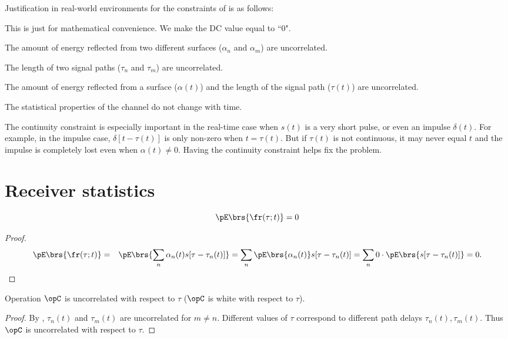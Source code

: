 Justification in real-world environments 
for the constraints of  is as follows:
\begin{enume}
  \item This is just for mathematical convenience.
        We make the DC value equal to ``0".
  \item The amount of energy reflected from two different surfaces
        ($\alpha_n$ and $\alpha_m$) are uncorrelated.
  \item The length of two signal paths ($\tau_n$ and $\tau_m$) 
        are uncorrelated.
  \item The amount of energy reflected from a surface ($\alpha(t)$)
        and the length of the signal path ($\tau(t)$) are 
        uncorrelated.
  \item The statistical properties of the channel do not change with time.
  \item The continuity constraint is especially important in the real-time
case when $s(t)$ is a very short pulse, or even an impulse $\delta(t)$.
For example, in the impulse case, $\delta[t-\tau(t)]$ is only non-zero
when $t=\tau(t)$. But if $\tau(t)$ is not continuous, it may never equal $t$
and the impulse is completely lost even when $\alpha(t)\ne0$. 
Having the continuity constraint helps fix the problem.
  \end{enume}

\section{Receiver statistics}
\begin{proposition}
\[\pE\brs{\fr(\tau;t)} = 0 \]
\end{proposition}
\begin{proof}
\begin{eqnarray*}
   \pE\brs{\fr(\tau;t)} 
     &=& \pE\brs{\sum_n \alpha_n(t)s[\tau-\tau_n(t)]}
      =  \sum_n \pE\brs{\alpha_n(t)}s[\tau-\tau_n(t)]
      =   \sum_n 0\cdot\pE\brs{s[\tau-\tau_n(t)]}
      =  0.
\end{eqnarray*}
\end{proof}

\begin{proposition}
\label{prop:mp_tau}
Operation $\opC$ is uncorrelated with respect to $\tau$
($\opC$ is white with respect to $\tau$).
\end{proposition}
\begin{proof}
By , 
$\tau_n(t)$ and $\tau_m(t)$ are uncorrelated for $m\not=n$.
Different values of $\tau$ correspond to different 
path delays $\tau_n(t),\tau_m(t)$.
Thus $\opC$ is uncorrelated with respect to $\tau$.
\end{proof}

